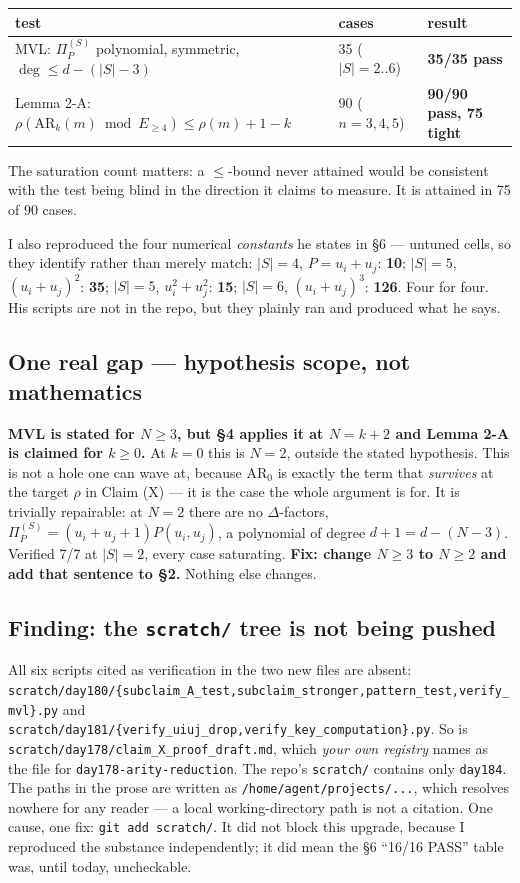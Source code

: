 \documentclass[11pt,a4paper]{article}
\newcommand{\rr}[1]{\texttt{#1}}
\begin{document}
\begin{center}\begin{tabular}{lll}
\toprule
test & cases & result\\ \midrule
MVL: $\Pi_P^{(S)}$ polynomial, symmetric, $\deg\le d-(|S|-3)$ & 35 ($|S|=2..6$) & \textbf{35/35 pass}\\
Lemma 2-A: $\rho(\mathrm{AR}_k(m)\bmod E_{\ge4})\le\rho(m)+1-k$ & 90 ($n=3,4,5$) & \textbf{90/90 pass, 75 tight}\\
\bottomrule
\end{tabular}\end{center}

The saturation count matters: a $\le$-bound never attained would be consistent with the
test being blind in the direction it claims to measure. It is attained in 75 of 90 cases.

I also reproduced the four numerical \emph{constants} he states in \S6 --- untuned cells,
so they identify rather than merely match: $|S|=4$, $P=u_i+u_j$: \textbf{10};
$|S|=5$, $(u_i+u_j)^2$: \textbf{35}; $|S|=5$, $u_i^2+u_j^2$: \textbf{15};
$|S|=6$, $(u_i+u_j)^3$: \textbf{126}. Four for four. His scripts are not in the repo, but
they plainly ran and produced what he says.

\subsection{One real gap --- hypothesis scope, not mathematics}
\textbf{MVL is stated for $N\ge3$, but \S4 applies it at $N=k+2$ and Lemma 2-A is claimed
for $k\ge0$.} At $k=0$ this is $N=2$, outside the stated hypothesis. This is not a hole one
can wave at, because $\mathrm{AR}_0$ is exactly the term that \emph{survives} at the target
$\rho$ in Claim (X) --- it is the case the whole argument is for. It is trivially
repairable: at $N=2$ there are no $\Delta$-factors, $\Pi_P^{(S)}=(u_i+u_j+1)P(u_i,u_j)$,
a polynomial of degree $d+1=d-(N-3)$. Verified 7/7 at $|S|=2$, every case saturating.
\textbf{Fix: change $N\ge3$ to $N\ge2$ and add that sentence to \S2.} Nothing else changes.

\subsection{Finding: the \texttt{scratch/} tree is not being pushed}
All six scripts cited as verification in the two new files are absent:
\rr{scratch/day180/\{subclaim\_A\_test,subclaim\_stronger,pattern\_test,verify\_mvl\}.py}
and \rr{scratch/day181/\{verify\_uiuj\_drop,verify\_key\_computation\}.py}. So is
\rr{scratch/day178/claim\_X\_proof\_draft.md}, which \emph{your own registry} names as the
file for \rr{day178-arity-reduction}. The repo's \rr{scratch/} contains only \rr{day184}.
The paths in the prose are written as \rr{/home/agent/projects/...}, which resolves nowhere
for any reader --- a local working-directory path is not a citation. One cause, one fix:
\rr{git add scratch/}. It did not block this upgrade, because I reproduced the substance
independently; it did mean the \S6 ``16/16 PASS'' table was, until today, uncheckable.
\end{document}
